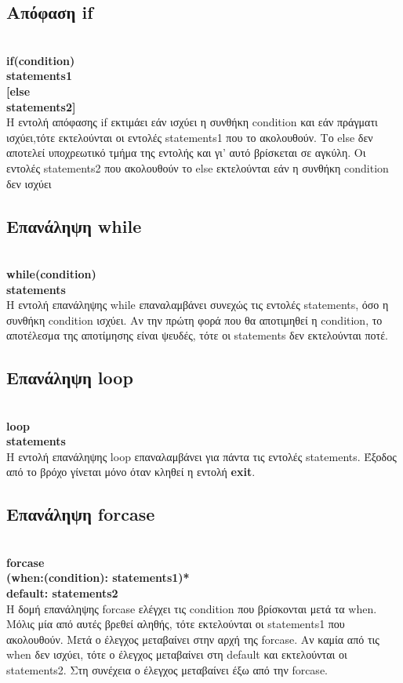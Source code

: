 \documentclass[12pt,a4paper,a4paper]{report}
\begin{document}
 \subsection{Απόφαση if}
\hspace{10mm}\\
 \textbf{if(condition)\\\hspace*{10mm}statements1}\\ \textbf{ [else\\\hspace*{10mm}statements2] }\\
Η εντολή απόφασης if εκτιμάει εάν ισχύει η συνθήκη condition και εάν πράγματι ισχύει,τότε εκτελούνται οι εντολές statements1 που το ακολουθούν. Το else δεν αποτελεί υποχρεωτικό τμήμα της εντολής και γι’ αυτό βρίσκεται σε αγκύλη. Οι εντολές statements2 που ακολουθούν το else εκτελούνται εάν η συνθήκη condition δεν ισχύει\\
 \subsection{Eπανάληψη while}
 \hspace{10mm}\\
 \textbf{while(condition)\\\hspace*{10mm}statements}\\
 H εντολή επανάληψης while επαναλαμβάνει συνεχώς τις εντολές statements, όσο η συνθήκη condition ισχύει. Αν την πρώτη φορά που θα αποτιμηθεί η condition, το αποτέλεσμα της αποτίμησης είναι ψευδές, τότε οι statements δεν εκτελούνται ποτέ.\\    
  \subsection{Eπανάληψη loop}
 \hspace{10mm}\\
 \textbf{loop\\\hspace*{10mm}statements}\\
 H εντολή επανάληψης loop επαναλαμβάνει για πάντα τις εντολές statements. Έξοδος από το βρόχο γίνεται μόνο όταν κληθεί η εντολή \textbf{exit}.\\
 \subsection{Επανάληψη forcase}
  \hspace{10mm}\\
  \textbf{forcase\\\hspace*{10mm}(when:(condition): statements1)*\\\hspace*{10mm}default: statements2}\\
Η δομή επανάληψης forcase ελέγχει τις condition που βρίσκονται μετά τα when. Μόλις μία από αυτές βρεθεί αληθής, τότε εκτελούνται οι statements1 που ακολουθούν. Μετά ο έλεγχος μεταβαίνει στην αρχή της forcase. Αν καμία από τις when δεν ισχύει, τότε ο έλεγχος μεταβαίνει στη default και εκτελούνται οι statements2. Στη συνέχεια ο έλεγχος μεταβαίνει έξω από την forcase.
\end{document}
